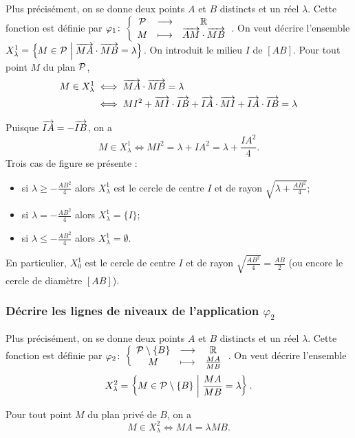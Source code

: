 Plus précisément, on se  donne deux points \(A\) et \(B\) distincts et 
un réel \(\lambda\). Cette fonction est définie par 
\(\fonction{\varphi_1}{\P}{\R}{M}{\vect{AM} \cdot \vect{MB}}\). On veut 
décrire l'ensemble \(X_{\lambda}^{1} = \enstq{M \in \P}{\vect{MA} \cdot 
\vect{MB} = \lambda}\). On introduit le milieu \(I\) de \([AB]\). Pour 
tout point \(M\) du plan \(\P\),
\begin{align}
  M \in X_{\lambda}^{1} & \iff \vect{MA} \cdot \vect{MB} = \lambda \\ 
                        & \iff MI^2 + \vect{MI} \cdot \vect{IB} + 
                        \vect{IA} \cdot \vect{MI} + \vect{IA} \cdot 
                        \vect{IB} = \lambda
\end{align}

Puisque \(\vect{IA} = -\vect{IB}\), on a 
\begin{equation}
  M \in X_{\lambda}^{1}  \iff MI^2 = \lambda + IA^2 = \lambda + 
  \frac{IA^2}{4}.
\end{equation}
Trois cas de figure se présente :
\begin{itemize}
  \item si \(\lambda \geqslant -\frac{AB^2}{4}\) alors 
    \(X_{\lambda}^{1}\) est le cercle de centre \(I\) et de rayon 
    \(\sqrt{\lambda +\frac{AB^2}{4}}\);
  \item si \(\lambda = -\frac{AB^2}{4}\) alors \(X_{\lambda}^{1} = 
    \{I\}\);
  \item si \(\lambda \leqslant -\frac{AB^2}{4}\) alors 
    \(X_{\lambda}^{1} = \emptyset\).
\end{itemize}
En particulier, \(X_{0}^{1}\) est le cercle de centre \(I\) et de 
rayon \(\sqrt{\frac{AB^2}{4}} = \frac{AB}{2}\) (ou encore le cercle de 
diamètre \([AB]\)).

\subsubsection{Décrire les lignes de niveaux de l'application 
\(\varphi_2\)}

Plus précisément, on se donne deux points \(A\) et \(B\) distincts et 
un réel \(\lambda\). Cette fonction est définie par 
\(\fonction{\varphi_2}{\P\setminus\{B\}}{\R}{M}{\frac{MA}{MB}}\). On 
veut décrire l'ensemble
\begin{equation}
  X_{\lambda}^2 = \enstq{M \in \P\setminus\{B\}}{\frac{MA}{MB} = 
\lambda}.
\end{equation}

Pour tout point \(M\) du plan privé de \(B\), on a
\begin{equation}
  M \in X_{\lambda}^2 \iff MA = \lambda MB.
\end{equation}

